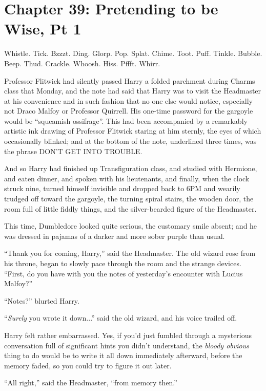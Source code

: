 \chapter{Chapter 39: Pretending to be Wise, Pt 1}
Whistle. Tick. Bzzzt. Ding. Glorp. Pop. Splat. Chime. Toot. Puff.
Tinkle. Bubble. Beep. Thud. Crackle. Whoosh. Hiss. Pffft. Whirr.

Professor Flitwick had silently passed Harry a folded parchment during
Charms class that Monday, and the note had said that Harry was to visit
the Headmaster at his convenience and in such fashion that no one else
would notice, especially not Draco Malfoy or Professor Quirrell. His
one-time password for the gargoyle would be ``squeamish ossifrage''.
This had been accompanied by a remarkably artistic ink drawing of
Professor Flitwick staring at him sternly, the eyes of which
occasionally blinked; and at the bottom of the note, underlined three
times, was the phrase DON'T GET INTO TROUBLE.

And so Harry had finished up Transfiguration class, and studied with
Hermione, and eaten dinner, and spoken with his lieutenants, and
finally, when the clock struck nine, turned himself invisible and
dropped back to 6PM and wearily trudged off toward the gargoyle, the
turning spiral stairs, the wooden door, the room full of little fiddly
things, and the silver-bearded figure of the Headmaster.

This time, Dumbledore looked quite serious, the customary smile absent;
and he was dressed in pajamas of a darker and more sober purple than
usual.

``Thank you for coming, Harry,'' said the Headmaster. The old wizard
rose from his throne, began to slowly pace through the room and the
strange devices. ``First, do you have with you the notes of yesterday's
encounter with Lucius Malfoy?''

``Notes?'' blurted Harry.

``\emph{Surely} you wrote it down...'' said the old wizard, and his
voice trailed off.

Harry felt rather embarrassed. Yes, if you'd just fumbled through a
mysterious conversation full of significant hints you didn't understand,
the \emph{bloody obvious} thing to do would be to write it all down
immediately afterward, before the memory faded, so you could try to
figure it out later.

``All right,'' said the Headmaster, ``from memory then.''


